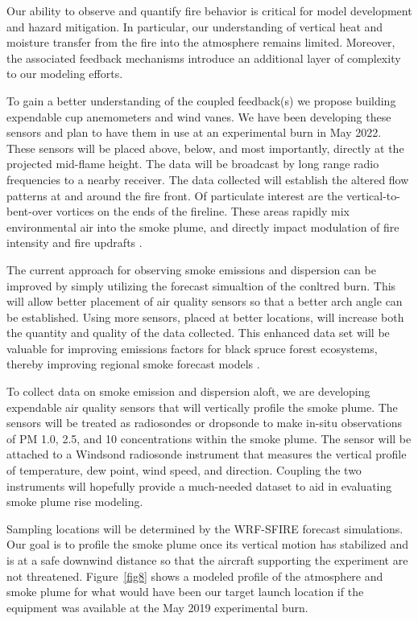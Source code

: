 \documentclass[preprints,article,accept,moreauthors,pdftex]{Definitions/mdpi}
\begin{document}
Our ability to observe and quantify fire behavior is critical for model development and hazard mitigation. In particular, our understanding of vertical heat and moisture transfer from the fire into the atmosphere remains limited. Moreover, the associated feedback mechanisms introduce an additional layer of complexity to our modeling efforts.

To gain a better understanding of the coupled feedback(s) we propose building expendable cup anemometers and wind vanes. We have been developing these sensors and plan to have them in use at an experimental burn in May 2022. These sensors will be placed above, below, and most importantly, directly at the projected mid-flame height. The data will be broadcast by long range radio frequencies to a nearby receiver. The data collected will establish the altered flow patterns at and around the fire front. Of particulate interest are the vertical-to-bent-over vortices on the ends of the fireline. These areas rapidly mix environmental air into the smoke plume, and directly impact modulation of fire intensity and fire updrafts \cite{moisseeva_capturing_2019,moisseeva_wildfire_2021,clements_fire_2016}.

The current approach for observing smoke emissions and dispersion can be improved by simply utilizing the forecast simualtion of the conltred burn. This will allow better placement of air quality sensors so that a better arch angle can be established. Using more sensors, placed at better locations, will increase both the quantity and quality of the data collected. This enhanced data set will be valuable for improving emissions factors for black spruce forest ecosystems, thereby improving regional smoke forecast models \cite{prichard_wildland_2020}.

To collect data on smoke emission and dispersion aloft, we are developing expendable air quality sensors that will vertically profile the smoke plume. The sensors will be treated as radiosondes or dropsonde to make in-situ observations of PM 1.0, 2.5, and 10 concentrations within the smoke plume. The sensor will be attached to a Windsond radiosonde instrument \cite{bessardon_evaluation_2019} that measures the vertical profile of temperature, dew point, wind speed, and direction. Coupling the two instruments will hopefully provide a much-needed dataset to aid in evaluating smoke plume rise modeling.

Sampling locations will be determined by the WRF-SFIRE forecast simulations. Our goal is to profile the smoke plume once its vertical motion has stabilized and is at a safe downwind distance so that the aircraft supporting the experiment are not threatened. Figure~\ref{fig8} shows a modeled profile of the atmosphere and smoke plume for what would have been our target launch location if the equipment was available at the May 2019 experimental burn.
\end{document}
